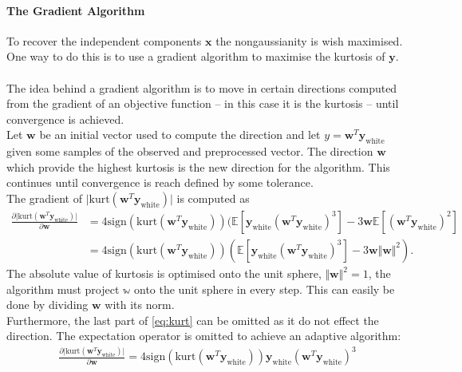 \paragraph{The Gradient Algorithm}
To recover the independent components $\mathbf{x}$ the nongaussianity is wish maximised. One way to do this is to use a gradient algorithm to maximise the kurtosis of $\mathbf{y}$.
\\ \\
The idea behind a gradient algorithm is to move in certain directions computed from the gradient of an objective function -- in this case it is the kurtosis -- until convergence is achieved.
\\
Let $\mathbf{w}$ be an initial vector used to compute the direction and let $y = \mathbf{w}^T \mathbf{y}_{\text{white}}$ given some samples of the observed and preprocessed vector. The direction $\mathbf{w}$ which provide the highest kurtosis is the new direction for the algorithm. This continues until convergence is reach defined by some tolerance.
\\
The gradient of $\vert \text{kurt}(\mathbf{w}^T \mathbf{y}_{\text{white}}) \vert$ is computed as
\begin{align}\label{eq:kurt}
\frac{\partial \vert \text{kurt}(\mathbf{w}^T \mathbf{y}_{\text{white}})\vert}{\partial \mathbf{w}} &= 4 \text{sign}(\text{kurt}(\mathbf{w}^T \mathbf{y}_{\text{white}})) (\mathbb{E}[\mathbf{y}_{\text{white}} (\mathbf{w}^T \mathbf{y}_{\text{white}})^3] - 3 \mathbf{w} \mathbb{E}[(\mathbf{w}^T \mathbf{y}_{\text{white}})^2] \nonumber \\
&= 4 \text{sign}(\text{kurt}(\mathbf{w}^T \mathbf{y}_{\text{white}})) (\mathbb{E}[\mathbf{y}_{\text{white}} (\mathbf{w}^T \mathbf{y}_{\text{white}})^3] - 3 \mathbf{w} \Vert \mathbf{w} \Vert^2).
\end{align}
The absolute value of kurtosis is optimised onto the unit sphere, $\Vert \mathbf{w} \Vert^2 = 1$, the algorithm must project $\mathbb{w}$ onto the unit sphere in every step. This can easily be done by dividing $\mathbf{w}$ with its norm. 
\\
Furthermore, the last part of \eqref{eq:kurt} can be omitted as it do not effect the direction. The expectation operator is omitted to achieve an adaptive algorithm:
\begin{align*}
\frac{\partial \vert \text{kurt}(\mathbf{w}^T \mathbf{y}_{\text{white}})\vert}{\partial \mathbf{w}} = 4 \text{sign}(\text{kurt}(\mathbf{w}^T \mathbf{y}_{\text{white}})) \mathbf{y}_{\text{white}} (\mathbf{w}^T \mathbf{y}_{\text{white}})^3
\end{align*}
